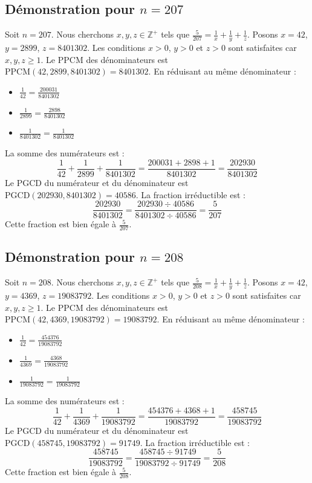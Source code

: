 \documentclass[11pt,a4paper]{article}
\begin{document}
\subsection{Démonstration pour $n = 207$}
Soit $n = 207$. Nous cherchons $x, y, z \in \mathbb{Z}^{+}$ tels que $\frac{5}{207} = \frac{1}{x} + \frac{1}{y} + \frac{1}{z}$.
Posons $x = 42$, $y = 2899$, $z = 8401302$.
Les conditions $x > 0$, $y > 0$ et $z > 0$ sont satisfaites car $x, y, z \geq 1$.
Le PPCM des dénominateurs est $\text{PPCM}(42, 2899, 8401302) = 8401302$.
En réduisant au même dénominateur :
\begin{itemize}
    \item $\frac{1}{42} = \frac{200031}{8401302}$
    \item $\frac{1}{2899} = \frac{2898}{8401302}$
    \item $\frac{1}{8401302} = \frac{1}{8401302}$
\end{itemize}
La somme des numérateurs est :
$$ \frac{1}{42} + \frac{1}{2899} + \frac{1}{8401302} = \frac{200031 + 2898 + 1}{8401302} = \frac{202930}{8401302} $$
Le PGCD du numérateur et du dénominateur est $\text{PGCD}(202930, 8401302) = 40586$.
La fraction irréductible est :
$$ \frac{202930}{8401302} = \frac{202930 \div 40586}{8401302 \div 40586} = \frac{5}{207} $$
Cette fraction est bien égale à $\frac{5}{207}$.

\subsection{Démonstration pour $n = 208$}
Soit $n = 208$. Nous cherchons $x, y, z \in \mathbb{Z}^{+}$ tels que $\frac{5}{208} = \frac{1}{x} + \frac{1}{y} + \frac{1}{z}$.
Posons $x = 42$, $y = 4369$, $z = 19083792$.
Les conditions $x > 0$, $y > 0$ et $z > 0$ sont satisfaites car $x, y, z \geq 1$.
Le PPCM des dénominateurs est $\text{PPCM}(42, 4369, 19083792) = 19083792$.
En réduisant au même dénominateur :
\begin{itemize}
    \item $\frac{1}{42} = \frac{454376}{19083792}$
    \item $\frac{1}{4369} = \frac{4368}{19083792}$
    \item $\frac{1}{19083792} = \frac{1}{19083792}$
\end{itemize}
La somme des numérateurs est :
$$ \frac{1}{42} + \frac{1}{4369} + \frac{1}{19083792} = \frac{454376 + 4368 + 1}{19083792} = \frac{458745}{19083792} $$
Le PGCD du numérateur et du dénominateur est $\text{PGCD}(458745, 19083792) = 91749$.
La fraction irréductible est :
$$ \frac{458745}{19083792} = \frac{458745 \div 91749}{19083792 \div 91749} = \frac{5}{208} $$
Cette fraction est bien égale à $\frac{5}{208}$.
\end{document}
